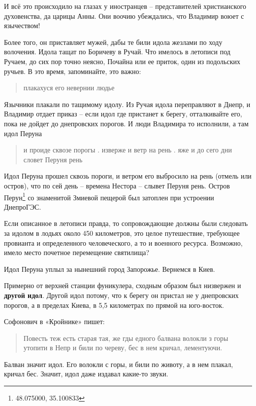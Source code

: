 \documentclass[a5paper,11pt,openany]{article}
\begin{document}
И всё это происходило на глазах у иностранцев – представителей христианского духовенства, да царицы Анны. Они воочию убеждались, что Владимир воюет с язычеством!

Более того, он приставляет мужей, дабы те били идола жезлами по ходу волочения. Идола тащат по Боричеву в Ручай. Что имелось в летописи под Ручаем, до сих пор точно неясно, Почайна или ее приток, один из подольских ручьев. В это время, запоминайте, это важно:

\begin{quotation}
\noindent плакахуся его невернии людье 
\end{quotation}

Язычники плакали по тащимому идолу.
Из Ручая идола переправляют в Днепр, и Владимир отдает приказ – если идол где пристанет к берегу, отталкивайте его, пока не дойдет до днепровских порогов. И люди Владимира то исполнили, а там идол Перуна

\begin{quotation}
\noindent и проиде сквозе порогы . изверже
и ветр на рень . яже и до сего дни словет Перуня рень
\end{quotation}
  
Идол Перуна прошел сквозь пороги, и ветром его выбросило на рень (отмель или остров), что по сей день – времена Нестора – слывет Перуня рень. Остров Перун\footnote{48.075000, 35.100833} со знаменитой Змиевой пещерой был затоплен при устроении ДнепроГЭС.

Если описанное в летописи правда, то сопровождающие должны были следовать за идолом в лодьях около 450 километров, это целое путешествие, требующее провианта и определенного человеческого, а то и военного ресурса. Возможно, имело место почетное перемещение святилища?

Идол Перуна уплыл за нынешний город Запорожье. Вернемся в Киев.

Примерно от верхней станции фуникулера, сходным образом был низвержен и \textbf{другой идол}. Другой идол потому, что к берегу он пристал не у днепровских порогов, а в пределах Киева, в 5,5 километрах по прямой на юго-восток.

Софонович в «Кройнике» пишет: 

\begin{quotation}
\noindent Повесть теж есть старая тая, же гды едного балвана волокли з горы утопити в Непр и
били по череву, бес в нем кричал, лементуючи.\end{quotation}

Балван значит идол. Его волокли с горы, и били по животу, а в нем плакал, кричал бес. Значит, идол даже издавал какие-то звуки.
\end{document}
